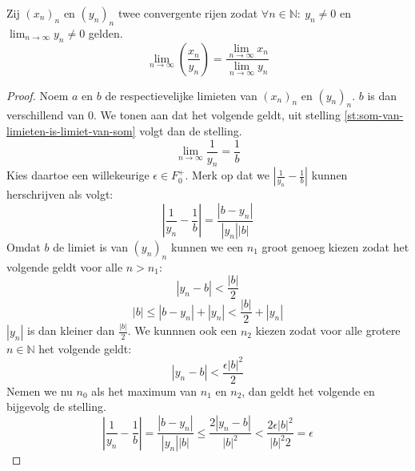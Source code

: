 \documentclass[main.tex]{subfiles}
\begin{document}
\begin{st}
  Zij $(x_{n})_{n}$ en $(y_{n})_{n}$ twee convergente rijen zodat $\forall n\in \mathbb{N}:\ y_{n}\neq 0$ en $\lim_{n\rightarrow \infty}y_{n} \neq 0$ gelden.
  \[ \lim_{n \rightarrow \infty}\left(\frac{x_{n}}{y_{n}}\right) = \frac{\lim_{n\rightarrow \infty}x_{n}}{\lim_{n\rightarrow \infty}y_{n}} \]

  \begin{proof}
    Noem $a$ en $b$ de respectievelijke limieten van $(x_{n})_{n}$ en $(y_{n})_{n}$.
    $b$ is dan verschillend van $0$.
    We tonen aan dat het volgende geldt, uit stelling \ref{st:som-van-limieten-is-limiet-van-som} volgt dan de stelling.
    \[ \lim_{n\rightarrow \infty}\frac{1}{y_{n}} = \frac{1}{b} \]
    Kies daartoe een willekeurige $\epsilon \in F_{0}^{+}$.
    Merk op dat we $\left|\frac{1}{y_{n}}-\frac{1}{b}\right|$ kunnen herschrijven als volgt:
    \[ \left|\frac{1}{y_{n}}-\frac{1}{b}\right| = \frac{|b-y_{n}|}{|y_{n}||b|} \]
    Omdat $b$ de limiet is van $(y_{n})_{n}$ kunnen we een $n_{1}$ groot genoeg kiezen zodat het volgende geldt voor alle $n>n_{1}$:
    \[ |y_{n}-b| < \frac{|b|}{2} \]
    \[ |b| \le |b-y_{n}| +|y_{n}| < \frac{|b|}{2} + |y_{n}| \]
    $|y_{n}|$ is dan kleiner dan $\frac{|b|}{2}$.
    We kunnnen ook een $n_{2}$ kiezen zodat voor alle grotere $n\in \mathbb{N}$ het volgende geldt:
    \[ |y_{n}-b| < \frac{\epsilon|b|^{2}}{2} \]
    Nemen we nu $n_{0}$ als het maximum van $n_{1}$ en $n_{2}$, dan geldt het volgende en bijgevolg de stelling.
    \[ \left|\frac{1}{y_{n}}-\frac{1}{b}\right| = \frac{|b-y_{n}|}{|y_{n}||b|} \le \frac{2|y_{n}-b|}{|b|^{2}} < \frac{2\epsilon|b|^{2}}{|b|^{2}2} = \epsilon \]
  \end{proof}
\end{st}
\end{document}
